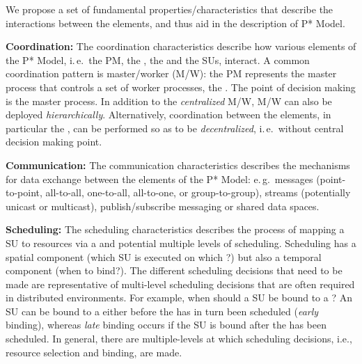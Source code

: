 \documentclass[conference]{IEEEtran}
\begin{document}

 
We propose a set of fundamental properties/characteristics that
describe the interactions between the elements, and thus aid in the
description of P* Model.


\textbf{Coordination:} The coordination characteristics describe how
various elements of the P* Model, i.\,e.\ the PM, the \pilot, the \cus
and the SUs, interact. A common coordination pattern is master/worker
(M/W): the PM represents the master process that controls a set of
worker processes, the \pilots. The point of decision making is the
master process. In addition to the \emph{centralized} M/W, M/W can
also be deployed \emph{hierarchically}.  Alternatively, coordination
between the elements, in particular the \pilots, can be performed so as
to be \emph{decentralized}, i.\,e.\ without central decision making
point.

%

\textbf{Communication:} The communication characteristics describes the
mechanisms for data exchange between the elements of the P* Model:
e.\,g.\ messages (point-to-point, all-to-all, one-to-all, all-to-one,
or group-to-group), streams (potentially unicast or multicast),
publish/subscribe messaging or shared data spaces.
		
\textbf{Scheduling:} The scheduling characteristics describes the
process of mapping a SU to resources via a \pilot and potential
multiple levels of scheduling. Scheduling has a spatial component
(which SU is executed on which \pilot?) but also a temporal component
(when to bind?). The different scheduling decisions that need to be
made are representative of multi-level scheduling decisions that are
often required in distributed environments.  For example, when should
a SU be bound to a \pilot?  An SU can be bound to a \pilot either before
the \pilot has in turn been scheduled ({\it early} binding), whereas
{\it late} binding occurs if the SU is bound after the \pilot has been
scheduled.  In general, there are multiple-levels at which scheduling
decisions, i.e., resource selection and binding, are made.
\end{document}
